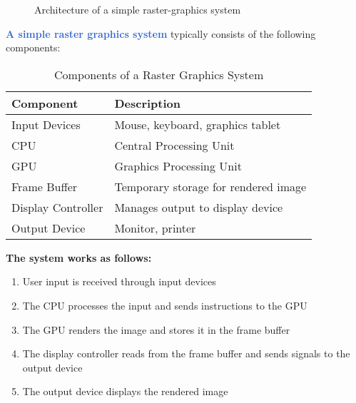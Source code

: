 \documentclass[12pt]{article}
\begin{document}
\begin{figure}[h]
\centering
{}
\caption{Architecture of a simple raster-graphics system}
\label{fig:raster-system}
\end{figure}

\textcolor{highlight}{\textbf{A simple raster graphics system}} typically consists of the following components:

\begin{table}[h]
\centering
\begin{tabulary}{\textwidth}{|L|L|}
\hline
\textbf{Component} & \textbf{Description} \\
\hline
Input Devices & Mouse, keyboard, graphics tablet \\
CPU & Central Processing Unit \\
GPU & Graphics Processing Unit \\
Frame Buffer & Temporary storage for rendered image \\
Display Controller & Manages output to display device \\
Output Device & Monitor, printer \\
\hline
\end{tabulary}
\caption{Components of a Raster Graphics System}
\label{tab:raster-system-components}
\end{table}

\textcolor{important}{\textbf{The system works as follows:}}
\begin{enumerate}
    \item User input is received through input devices
    \item The CPU processes the input and sends instructions to the GPU
    \item The GPU renders the image and stores it in the frame buffer
    \item The display controller reads from the frame buffer and sends signals to the output device
    \item The output device displays the rendered image
\end{enumerate}
\end{document}
